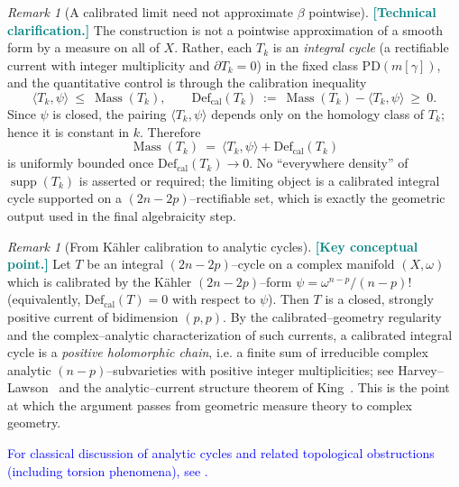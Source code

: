 \documentclass[11pt]{article}
\newcommand{\REV}[1]{\textcolor{blue}{#1}}
\newcommand{\REVMZ}[1]{\textcolor{teal}{#1}}  %
\numberwithin{equation}{section}  %
\theoremstyle{plain}
\theoremstyle{definition}
\theoremstyle{remark}
\newtheorem{remark}[theorem]{Remark}
\DeclareMathOperator{\Mass}{Mass}
\newcommand{\Def}{\mathrm{Def}}
\begin{document}
\begin{remark}[A calibrated limit need not approximate $\beta$ pointwise]\label{rem:density-mass}
\REVMZ{\textbf{[Technical clarification.]}}
The construction is not a pointwise approximation of a smooth form by a measure on all of $X$.
Rather, each $T_k$ is an \emph{integral cycle} (a rectifiable current with integer multiplicity and
$\partial T_k=0$) in the fixed class $\mathrm{PD}(m[\gamma])$, and the quantitative control is through
the calibration inequality
\[
\langle T_k,\psi\rangle \ \le\ \Mass(T_k),
\qquad
\Def_{\mathrm{cal}}(T_k)\ :=\ \Mass(T_k)-\langle T_k,\psi\rangle\ \ge\ 0 .
\]
Since $\psi$ is closed, the pairing $\langle T_k,\psi\rangle$ depends only on the homology class
of $T_k$; hence it is constant in $k$.  Therefore
\[
\Mass(T_k)\ =\ \langle T_k,\psi\rangle + \Def_{\mathrm{cal}}(T_k)
\]
is uniformly bounded once $\Def_{\mathrm{cal}}(T_k)\to 0$.  No ``everywhere density'' of $\operatorname{supp}(T_k)$
is asserted or required; the limiting object is a calibrated integral cycle supported on a
$(2n-2p)$--rectifiable set, which is exactly the geometric output used in the final algebraicity step.
\end{remark}

\begin{remark}[From K\"ahler calibration to analytic cycles]\label{rem:hl-applicable}
\REVMZ{\textbf{[Key conceptual point.]}}
Let $T$ be an integral $(2n-2p)$--cycle on a complex manifold $(X,\omega)$ which is calibrated by the
K\"ahler $(2n-2p)$--form $\psi=\omega^{n-p}/(n-p)!$ (equivalently, $\Def_{\mathrm{cal}}(T)=0$ with respect
to $\psi$).  Then $T$ is a closed, strongly positive current of bidimension $(p,p)$.
By the calibrated--geometry regularity and the complex--analytic characterization of such currents,
a calibrated integral cycle is a \emph{positive holomorphic chain}, i.e. a finite sum of irreducible
complex analytic $(n-p)$--subvarieties with positive integer multiplicities; see
Harvey--Lawson~\cite{HL82} and the analytic--current structure theorem of King~\cite{King71}.
This is the point at which the argument passes from geometric measure theory to complex geometry.

\REV{For classical discussion of analytic cycles and related topological obstructions (including torsion phenomena), see \cite{AtiyahHirzebruch62}.}
\end{remark}
\end{document}
